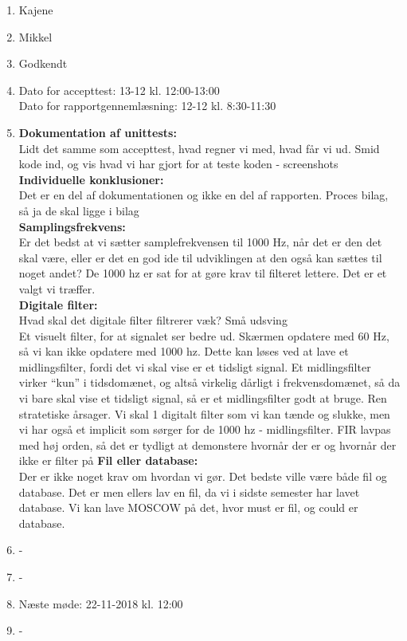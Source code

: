 \begin{enumerate}
	\item Kajene
	\item Mikkel
	\item Godkendt
	\item Dato for accepttest: 13-12 kl. 12:00-13:00 \\ Dato for rapportgennemlæsning: 12-12 kl. 8:30-11:30
	\item \textbf{Dokumentation af unittests:} \\
	Lidt det samme som accepttest, hvad regner vi med, hvad får vi ud. Smid kode ind, og vis hvad vi har gjort for at teste koden - screenshots \\
	\textbf{Individuelle konklusioner: } \\
	Det er en del af dokumentationen og ikke en del af rapporten. Proces bilag, så ja de skal ligge i bilag \\
	\textbf{Samplingsfrekvens:} \\
	Er det bedst at vi sætter samplefrekvensen til 1000 Hz, når det er den det skal være, eller er det en god ide til udviklingen at den også kan sættes til noget andet?
	De 1000 hz er sat for at gøre krav til filteret lettere. Det er et valgt vi træffer. \\
	\textbf{Digitale filter:} \\
	Hvad skal det digitale filter filtrerer væk?
	Små udsving \\
	Et visuelt filter, for at signalet ser bedre ud. Skærmen opdatere med 60 Hz, så vi kan ikke opdatere med 1000 hz. Dette kan løses ved at lave et midlingsfilter, fordi det vi skal vise er et tidsligt signal. Et midlingsfilter virker “kun” i tidsdomænet, og altså virkelig dårligt i frekvensdomænet, så da vi bare skal vise et tidsligt signal, så er et midlingsfilter godt at bruge. Ren stratetiske årsager.
	Vi skal 1 digitalt  filter som vi kan tænde og slukke, men vi har også et implicit som sørger for de 1000 hz - midlingsfilter.
	FIR lavpas med høj orden, så det er tydligt at demonstere hvornår der er og hvornår der ikke er filter på
	\textbf{Fil eller database:} \\
	Der er ikke noget krav om hvordan vi gør.
	Det bedste ville være både fil og database. Det er men ellers lav en fil, da vi i sidste semester har lavet database. Vi kan lave MOSCOW på det, hvor must er fil, og could er database.
	\item - \\
	\item - \\
	\item Næste møde: 22-11-2018 kl. 12:00 \\ 
	\item -
	
\end{enumerate}

\clearpage